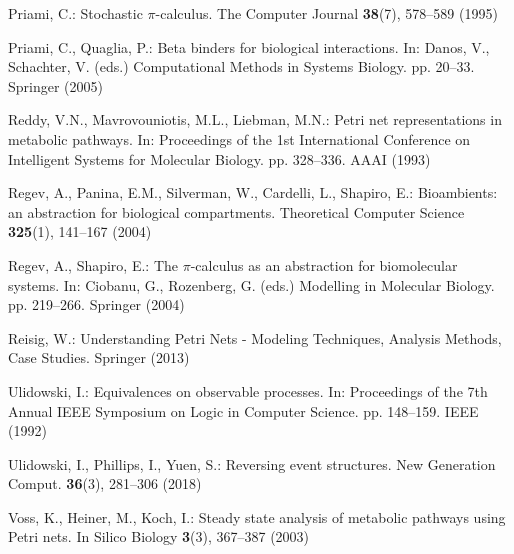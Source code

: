 \documentclass[runningheads]{llncs}
\begin{document}
\begin{thebibliography}{10}
Priami, C.: Stochastic $\pi$-calculus. The Computer Journal  \textbf{38}(7),
  578--589 (1995)

Priami, C., Quaglia, P.: Beta binders for biological interactions. In: Danos,
  V., Schachter, V. (eds.) Computational Methods in Systems Biology. pp.
  20--33. Springer (2005)

Reddy, V.N., Mavrovouniotis, M.L., Liebman, M.N.: Petri net representations in
  metabolic pathways. In: Proceedings of the 1st International Conference on
  Intelligent Systems for Molecular Biology. pp. 328--336. {AAAI} (1993)

Regev, A., Panina, E.M., Silverman, W., Cardelli, L., Shapiro, E.: Bioambients:
  an abstraction for biological compartments. Theoretical Computer Science
  \textbf{325}(1),  141--167 (2004)

Regev, A., Shapiro, E.: The $\pi$-calculus as an abstraction for biomolecular
  systems. In: Ciobanu, G., Rozenberg, G. (eds.) Modelling in Molecular
  Biology. pp. 219--266. Springer (2004)

Reisig, W.: Understanding Petri Nets - Modeling Techniques, Analysis Methods,
  Case Studies. Springer (2013)

Ulidowski, I.: Equivalences on observable processes. In: Proceedings of the 7th
  Annual IEEE Symposium on Logic in Computer Science. pp. 148--159. IEEE (1992)

Ulidowski, I., Phillips, I., Yuen, S.: Reversing event structures. New
  Generation Comput.  \textbf{36}(3),  281--306 (2018)

Voss, K., Heiner, M., Koch, I.: Steady state analysis of metabolic pathways
  using {P}etri nets. In Silico Biology  \textbf{3}(3),  367--387 (2003)

\end{thebibliography}

\end{document}
